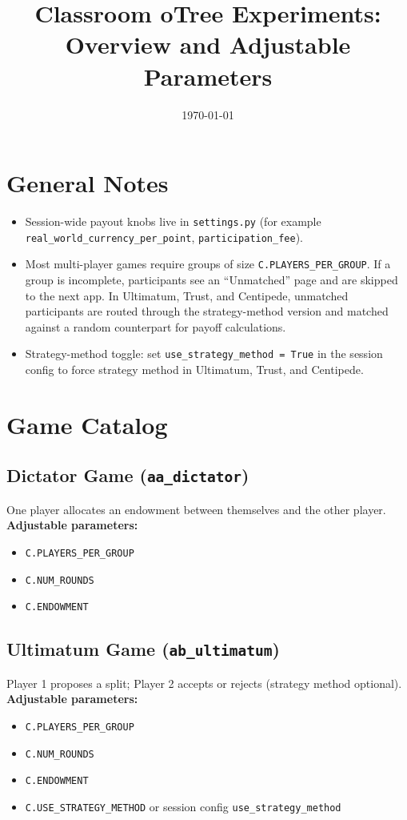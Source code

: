 \documentclass[11pt]{article}
\title{Classroom oTree Experiments: Overview and Adjustable Parameters}
\author{}
\date{\today}
\begin{document}
\maketitle

\section*{General Notes}
\begin{itemize}
\item Session-wide payout knobs live in \texttt{settings.py} (for example
      \texttt{real\_world\_currency\_per\_point}, \texttt{participation\_fee}).
\item Most multi-player games require groups of size \texttt{C.PLAYERS\_PER\_GROUP}.
      If a group is incomplete, participants see an ``Unmatched'' page and are
      skipped to the next app. In Ultimatum, Trust, and Centipede, unmatched
      participants are routed through the strategy-method version and matched
      against a random counterpart for payoff calculations.
\item Strategy-method toggle: set \texttt{use\_strategy\_method = True} in the
      session config to force strategy method in Ultimatum, Trust, and Centipede.
\end{itemize}

\section*{Game Catalog}

\subsection*{Dictator Game (\texttt{aa\_dictator})}
One player allocates an endowment between themselves and the other player.
\textbf{Adjustable parameters:}
\begin{itemize}
\item \texttt{C.PLAYERS\_PER\_GROUP}
\item \texttt{C.NUM\_ROUNDS}
\item \texttt{C.ENDOWMENT}
\end{itemize}

\subsection*{Ultimatum Game (\texttt{ab\_ultimatum})}
Player 1 proposes a split; Player 2 accepts or rejects (strategy method optional).
\textbf{Adjustable parameters:}
\begin{itemize}
\item \texttt{C.PLAYERS\_PER\_GROUP}
\item \texttt{C.NUM\_ROUNDS}
\item \texttt{C.ENDOWMENT}
\item \texttt{C.USE\_STRATEGY\_METHOD} or session config \texttt{use\_strategy\_method}
\end{itemize}
\end{document}
